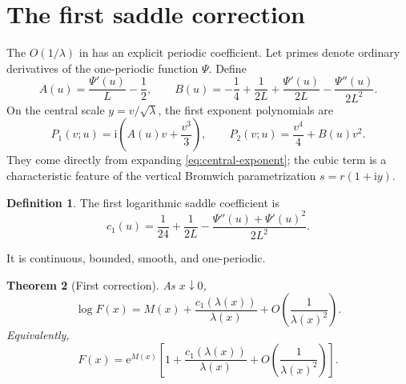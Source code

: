 \documentclass[11pt]{article}
\numberwithin{equation}{section}
\newtheorem{theorem}{Theorem}[section]
\theoremstyle{definition}
\newtheorem{definition}[theorem]{Definition}
\theoremstyle{remark}
\newcommand{\e}{\mathrm{e}}
\newcommand{\ii}{\mathrm{i}}
\begin{document}
\section{The first saddle correction}\label{sec:first-correction}

The $O(1/\lambda)$ in  has an explicit periodic
coefficient.  Let primes denote ordinary derivatives of the one-periodic
function $\Psi$.  Define
\begin{equation}\label{eq:A-B-saddle}
 A(u)=\frac{\Psi'(u)}L-\frac12,
 \qquad
 B(u)=-\frac14+\frac1{2L}+\frac{\Psi'(u)}{2L}
      -\frac{\Psi''(u)}{2L^2}.
\end{equation}
On the central scale $y=v/\sqrt\lambda$, the first exponent polynomials are
\begin{equation}\label{eq:P1P2}
 P_1(v;u)=\ii\left(A(u)v+\frac{v^3}{3}\right),
 \qquad
 P_2(v;u)=\frac{v^4}{4}+B(u)v^2.
\end{equation}
They come directly from expanding \eqref{eq:central-exponent}; the cubic term
is a characteristic feature of the vertical Bromwich parametrization
$s=r(1+\ii y)$.

\begin{definition}\label{def:c1}
The first logarithmic saddle coefficient is
\begin{equation}\label{eq:c1}
 c_1(u)=\frac1{24}+\frac1{2L}
 -\frac{\Psi''(u)+\Psi'(u)^2}{2L^2}.
\end{equation}
\end{definition}
It is continuous, bounded, smooth, and one-periodic.

\begin{theorem}[First correction]\label{thm:first-correction}
As $x\downarrow0$,
\begin{equation}\label{eq:first-correction-log}
 \log F(x)=M(x)+\frac{c_1(\lambda(x))}{\lambda(x)}
 +O\left(\frac1{\lambda(x)^2}\right).
\end{equation}
Equivalently,
\begin{equation}\label{eq:first-correction-ratio}
 F(x)=\e^{M(x)}\left[
 1+\frac{c_1(\lambda(x))}{\lambda(x)}
 +O\left(\frac1{\lambda(x)^2}\right)
 \right].
\end{equation}
\end{theorem}
\end{document}
